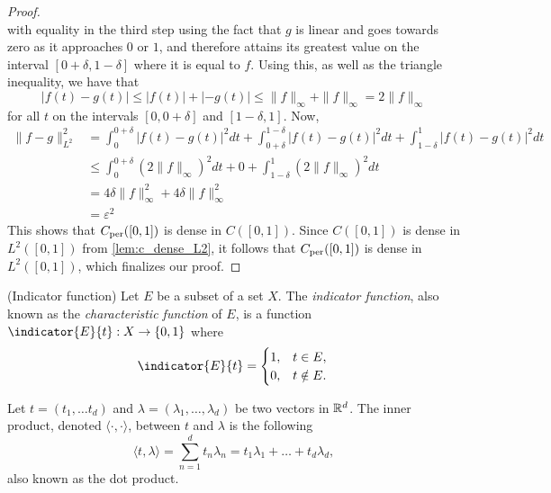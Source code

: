 \documentclass[../thesis.tex]{subfiles}
\begin{document}
\begin{proof}
\begin{equation*}
    \end{equation*}
    with equality in the third step using the fact that $g$ is linear and goes towards zero as it approaches $0$ or $1$, and therefore attains its greatest value on the interval $[0+\delta,1-\delta]$ where it is equal to $f$. Using this, as well as the triangle inequality, we have that
    \begin{equation*}
        \left|f(t)-g(t) \right| \leq |f(t)| + |-g(t)| \leq \|f \|_{\infty} + \|f \|_{\infty} = 2 \|f \|_{\infty}
    \end{equation*}
    for all $t$ on the intervals $[0, 0+\delta]$ and $[1-\delta,1]$. Now,
    \begin{align*}
        \| f-g \|_{L^2}^2 &=  \int_0^{0+\delta} \left|f(t)-g(t) \right|^2dt + \int_{0+\delta}^{1-\delta} \left|f(t)-g(t) \right|^2dt +\int_{1-\delta}^{1} \left|f(t)-g(t) \right|^2dt\\ 
        &\leq \int_0^{0+\delta} (2 \| f\|_\infty)^2dt + 0 +\int_{1-\delta}^{1} (2 \| f\|_\infty)^2dt\\
        &=  4 \delta \| f\|_\infty^2 + 4 \delta \| f\|_\infty^2\\ 
        &= \varepsilon^2
    \end{align*}
    This shows that $C_{\text{per}}([0,1])$ is dense in $C([0,1])$. Since $C([0,1])$ is dense in $L^2([0,1])$ from \cref{lem:c_dense_L2}, it follows that $C_{\text{per}}([0,1])$ is dense in $L^2([0,1])$, which finalizes our proof.
\end{proof}

\begin{definition}(Indicator function)\label{def:indicator}
    Let $E$ be a subset of a set $X$. The \emph{indicator function}, also known as the \emph{characteristic function} of $E$, is a function $\indicator{E}{t}: X \rightarrow \braq{0,1}$ where
    \begin{equation*}
        \indicator{E}{t}  = 
        \begin{cases} 
            1, &  t\in E,\\
            0, &  t \notin E.
        \end{cases}
        \qedhere
    \end{equation*}
\end{definition}


\begin{definition}\label{def:dot_prod}
    Let $t=(t_1,\dots t_d)$ and $\lambda=(\lambda_1, \dots, \lambda_d)$ be two vectors in $\mathbb{R}^d$. The inner product, denoted $\langle \cdot, \cdot \rangle$, between $t$ and $\lambda$ is the following 
    \begin{equation*}
        \langle t, \lambda \rangle = \sum_{n=1}^d t_n \lambda_n = t_1\lambda_1 + \dots + t_d\lambda_d,
    \end{equation*}
    also known as the dot product. 
\end{definition}
\end{document}
